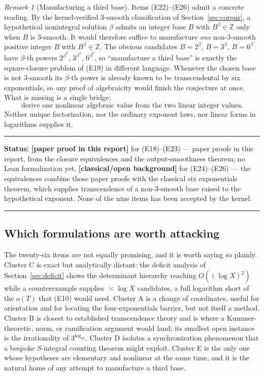 \documentclass[11pt,oneside]{article}
\theoremstyle{definition}
\theoremstyle{remark}
\newtheorem{remark}[theorem]{Remark}
\newcommand{\Z}{\mathbb Z}
\newcommand{\statusnew}{\textcolor{newgreen}{\textbf{[paper proof in this report]}}}
\newcommand{\statusknown}{\textcolor{classicalgray}{\textbf{[classical/\allowbreak open background]}}}
\newenvironment{statusbox}[1]
{\begin{center}\begin{minipage}{0.94\textwidth}\raggedright\hbadness=10000\hrule
\vspace{0.45em}\textbf{Status:} #1\par\vspace{0.35em}}
{\vspace{0.35em}\hrule\end{minipage}\end{center}}
\begin{document}
\begin{remark}[Manufacturing a third base]
\label{eq:rem-third-base}
Items (E22)--(E26) admit a concrete reading.  By the kernel-verified $3$-smooth classification
of Section~\ref{sec:corpus}, a hypothetical nonintegral solution $\beta$ admits an integer base
$B$ with $B^{\beta}\in\Z$ only when $B$ is $3$-smooth.  It would therefore suffice to
manufacture \emph{one} non-$3$-smooth positive integer $B$ with $B^{\beta}\in\Z$.  The obvious
candidates $B=2^{\beta}$, $B=3^{\beta}$, $B=6^{\beta}$ have $\beta$-th powers
$2^{\beta^2}$, $3^{\beta^2}$, $6^{\beta^2}$, so ``manufacture a third base'' is exactly the
square-closure problem of (E19) in different language.  Whenever the chosen base is not
$3$-smooth its $\beta$-th power is already known to be transcendental by six exponentials, so
any proof of algebraicity would finish the conjecture at once.  What is missing is a single
bridge:
\[
 \boxed{\text{derive one nonlinear algebraic value from the two linear integer values}.}
\]
Neither unique factorization, nor the ordinary exponent laws, nor linear forms in logarithms
supplies it.
\end{remark}

\begin{statusbox}{\statusnew{} for (E18)--(E23) --- paper proofs in this report, from the
closure equivalences and the output-smoothness theorem; no Lean formalization yet.
\statusknown{} for (E24)--(E26) --- the equivalences combine those paper proofs with the
classical six exponentials theorem, which supplies transcendence of a non-$3$-smooth base
raised to the hypothetical exponent.  None of the nine items has been accepted by the kernel.}
\end{statusbox}

\subsection{Which formulations are worth attacking}

The twenty-six items are not equally promising, and it is worth saying so plainly.  Cluster C
is exact but analytically distant: the deficit analysis of Section~\ref{sec:deficit} shows the
determinant hierarchy reaching $O((\log X)^2)$ while a counterexample supplies $\asymp\log X$
candidates, a full logarithm short of the $o(T)$ that (E10) would need.  Cluster A is a change
of coordinates, useful for orientation and for locating the four-exponentials barrier, but not
itself a method.  Cluster B is closest to established transcendence theory and is where a
Kummer-theoretic, norm, or ramification argument would land; its smallest open instance is the
irrationality of $3^{\log_23}$.  Cluster D isolates a synchronization phenomenon that a bespoke
$S$-integral counting theorem might exploit.  Cluster E is the only one whose hypotheses are
elementary and nonlinear at the same time, and it is the natural home of any attempt to
manufacture a third base.
\end{document}
